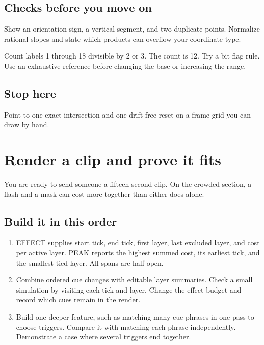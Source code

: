 \documentclass[11pt,letterpaper]{article}
\begin{document}
\subsection*{Checks before you move on}

Show an orientation sign, a vertical segment, and two duplicate points. Normalize rational slopes and state which products can overflow your coordinate type.

Count labels 1 through 18 divisible by 2 or 3. The count is 12. Try a bit flag rule. Use an exhaustive reference before changing the base or increasing the range.

\subsection*{Stop here}

Point to one exact intersection and one drift-free reset on a frame grid you can draw by hand.

\clearpage

\section{Render a clip and prove it fits}\label{visuals:10}

You are ready to send someone a fifteen-second clip. On the crowded section, a flash and a mask can cost more together than either does alone.

\subsection*{Build it in this order}

\begin{enumerate}
\item EFFECT supplies start tick, end tick, first layer, last excluded layer, and cost per active layer. PEAK reports the highest summed cost, its earliest tick, and the smallest tied layer. All spans are half-open.
\item Combine ordered cue changes with editable layer summaries. Check a small simulation by visiting each tick and layer. Change the effect budget and record which cues remain in the render.
\item Build one deeper feature, such as matching many cue phrases in one pass to choose triggers. Compare it with matching each phrase independently. Demonstrate a case where several triggers end together.
\end{enumerate}
\end{document}
